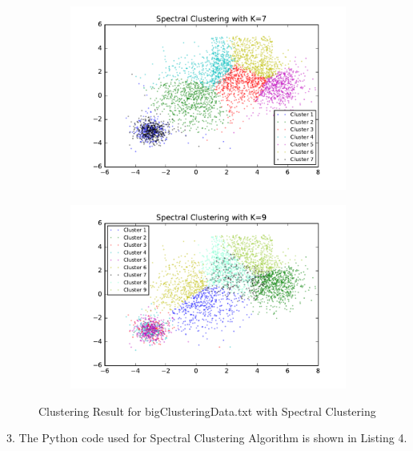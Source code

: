 \begin{description}
\begin{description}
\begin{figure}[!h]
        \begin{subfigure}[b]{0.475\textwidth}   
            \centering 
            \includegraphics[width=\textwidth]{./figures/bigClustering_spectral_7.pdf}
        \end{subfigure}
        \hfill
        \begin{subfigure}[b]{0.475\textwidth}   
            \centering 
            \includegraphics[width=\textwidth]{./figures/bigClustering_spectral_9.pdf}
        \end{subfigure}
        
        \caption{Clustering Result for bigClusteringData.txt with Spectral Clustering}
        \label{fig:spectral_bigClustering}
\end{figure}

\newpage
\item{3.} The Python code used for Spectral Clustering Algorithm is shown in Listing 4.


\end{description}
\end{description}
